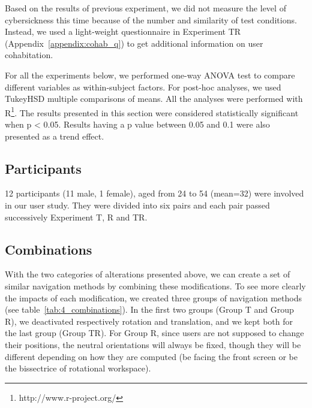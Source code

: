 Based on the results of previous experiment, we did not measure the level of cybersickness this time because of the number and similarity of test conditions. Instead, we used a light-weight questionnaire in Experiment TR (Appendix~\ref{appendix:cohab_q}) to get additional information on user cohabitation.

For all the experiments below, we performed one-way ANOVA test to compare different variables as within-subject factors. For post-hoc analyses, we used TukeyHSD multiple comparisons of means. All the analyses were performed with R\footnote{http://www.r-project.org/}. The results presented in this section were considered statistically significant when p \textless{} 0.05. Results having a p value between 0.05 and 0.1 were also presented as a trend effect.

\subsection{Participants}
12 participants (11 male, 1 female), aged from 24 to 54 (mean=32) were involved in our user study. They were divided into six pairs and each pair passed successively Experiment T, R and TR.

\subsection{Combinations}
With the two categories of alterations presented above, we can create a set of similar navigation methods by combining these modifications. To see more clearly the impacts of each modification, we created three groups of navigation methods (see table~\ref{tab:4_combinations}). In the first two groups (Group T and Group R), we deactivated respectively rotation and translation, and we kept both for the last group (Group TR). For Group R, since users are not supposed to change their positions, the neutral orientations will always be fixed, though they will be different depending on how they are computed (be facing the front screen or be the bissectrice of rotational workspace).

